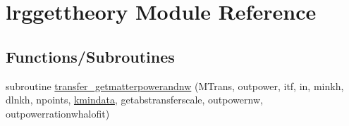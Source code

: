 \hypertarget{namespacelrggettheory}{}\section{lrggettheory Module Reference}
\label{namespacelrggettheory}
\subsection*{Functions/\+Subroutines}
\begin{DoxyCompactItemize}
\item 
subroutine \mbox{\hyperlink{namespacelrggettheory_abd8f5f818ab0125d9088ce80da0ca469}{transfer\+\_\+getmatterpowerandnw}} (M\+Trans, outpower, itf, in, minkh, dlnkh, npoints, \mbox{\hyperlink{namespacelrggettheory_a32295c6e11071f61c6311cac0eec283b}{kmindata}}, getabstransferscale, outpowernw, outpowerrationwhalofit)
\end{DoxyCompactItemize}
